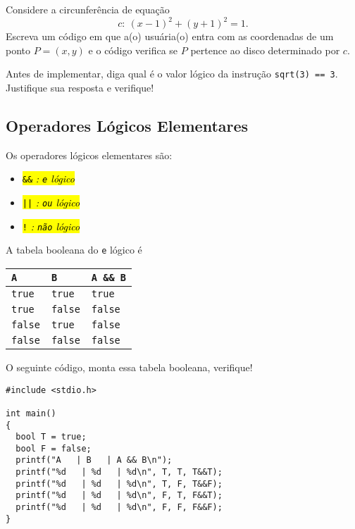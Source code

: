 \documentclass[12pt]{article}
\begin{document}
\begin{exr}
  Considere a circunferência de equação
  \begin{equation}
    c: ~(x - 1)^2 + (y + 1)^2 = 1.
  \end{equation}
  Escreva um código em que a(o) usuária(o) entra com as coordenadas de um ponto $P = (x, y)$ e o código verifica se $P$ pertence ao disco determinado por $c$.
\end{exr}

\begin{exr}
  Antes de implementar, diga qual é o valor lógico da instrução \lstinline+sqrt(3) == 3+. Justifique sua resposta e verifique!
\end{exr}

\subsection{Operadores Lógicos Elementares}

Os operadores lógicos elementares são:
\begin{itemize}
\item[]\hl{{\lstinline+&&+} \emph{: {\lstinline+e+} lógico}}
\item[]\hl{{\lstinline+||+} \emph{: {\lstinline+ou+} lógico}}
\item[]\hl{{\lstinline+!+} \emph{: {\lstinline+não+} lógico}}
\end{itemize}

\begin{ex}
  A tabela booleana{\boole} do \lstinline!e! lógico é
  \begin{center}
    \begin{tabular}[H]{ll|l}
      {\lstinline+A+} & {\lstinline+B+} &  {\lstinline+A && B+}\\\hline
      {\lstinline+true+} & {\lstinline+true+} & {\lstinline+true+} \\
      {\lstinline+true+} & {\lstinline+false+} & {\lstinline+false+} \\
      {\lstinline+false+} & {\lstinline+true+} & {\lstinline+false+} \\
      {\lstinline+false+} & {\lstinline+false+} & {\lstinline+false+} \\\hline
    \end{tabular}
  \end{center}

  O seguinte código, monta essa tabela booleana, verifique!
\begin{lstlisting}
#include <stdio.h>

int main()
{
  bool T = true;
  bool F = false;
  printf("A   | B   | A && B\n");
  printf("%d   | %d   | %d\n", T, T, T&&T);
  printf("%d   | %d   | %d\n", T, F, T&&F);
  printf("%d   | %d   | %d\n", F, T, F&&T);
  printf("%d   | %d   | %d\n", F, F, F&&F);
}
\end{lstlisting}
\end{ex}
\end{document}
